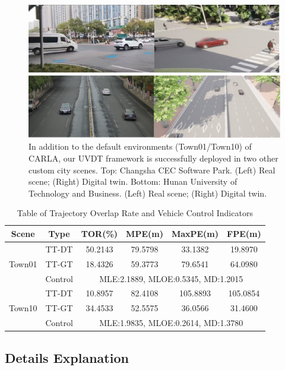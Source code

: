 \documentclass[journal,twoside,web]{ieeecolor}
\begin{document}
\begin{figure}[!t]
	\centerline{\includegraphics[width=\columnwidth]{picture/picture8.eps}}
	\caption{In addition to the default environments (Town01/Town10) of CARLA, our UVDT framework is successfully deployed in two other custom city scenes. Top: Changsha CEC Software Park. (Left) Real scene; (Right) Digital twin. Bottom: Hunan University of Technology and Business. (Left) Real scene; (Right) Digital twin.} 
	\label{fig8} 
\end{figure}

\begin{table}[t]
	\centering
	\caption{Table of Trajectory Overlap Rate and Vehicle Control Indicators}
	\label{tab:3}
	\renewcommand\arraystretch{1.3}
	\begin{tabular}{|c|c|c|c|c|c|}
		
		\hline
		Scene & Type & TOR(\%) & MPE(m) & MaxPE(m) & FPE(m) \\
		\hline
		\multirow{3}{*}{Town01} & TT-DT & 50.2143 & 79.5798 & 33.1382 & 19.8970 \\
		\cline{2-6}
		& TT-GT & 18.4326 & 59.3773 & 79.6541 & 64.0980 \\
		\cline{2-6}
		& Control & \multicolumn{4}{|c|}{MLE:2.1889, MLOE:0.5345, MD:1.2015} \\
		\hline
		\multirow{3}{*}{Town10} & TT-DT & 10.8957 & 82.4108 & 105.8893 & 105.0854 \\
		\cline{2-6}
		& TT-GT & 34.4533 & 52.5575 & 36.0566 & 31.4600 \\
		\cline{2-6}
		& Control & \multicolumn{4}{|c|}{MLE:1.9835, MLOE:0.2614, MD:1.3780} \\	
		\hline
	\end{tabular}
\end{table}

\subsection{Details Explanation}
\end{document}
